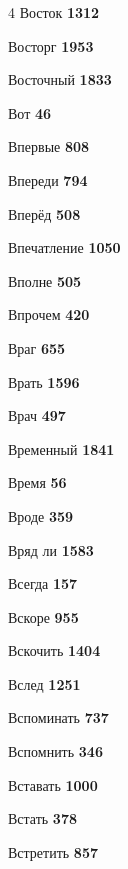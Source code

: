 \begin{multicols}{4}
\noindent Восток \dotfill \textbf{\color{secondary} 1312}\par
\noindent Восторг \dotfill \textbf{\color{secondary} 1953}\par
\noindent Восточный \dotfill \textbf{\color{secondary} 1833}\par
\noindent Вот \dotfill \textbf{\color{secondary} 46}\par
\noindent Впервые \dotfill \textbf{\color{secondary} 808}\par
\noindent Впереди \dotfill \textbf{\color{secondary} 794}\par
\noindent Вперёд \dotfill \textbf{\color{secondary} 508}\par
\noindent Впечатление \dotfill \textbf{\color{secondary} 1050}\par
\noindent Вполне \dotfill \textbf{\color{secondary} 505}\par
\noindent Впрочем \dotfill \textbf{\color{secondary} 420}\par
\noindent Враг \dotfill \textbf{\color{secondary} 655}\par
\noindent Врать \dotfill \textbf{\color{secondary} 1596}\par
\noindent Врач \dotfill \textbf{\color{secondary} 497}\par
\noindent Временный \dotfill \textbf{\color{secondary} 1841}\par
\noindent Время \dotfill \textbf{\color{secondary} 56}\par
\noindent Вроде \dotfill \textbf{\color{secondary} 359}\par
\noindent Вряд ли \dotfill \textbf{\color{secondary} 1583}\par
\noindent Всегда \dotfill \textbf{\color{secondary} 157}\par
\noindent Вскоре \dotfill \textbf{\color{secondary} 955}\par
\noindent Вскочить \dotfill \textbf{\color{secondary} 1404}\par
\noindent Вслед \dotfill \textbf{\color{secondary} 1251}\par
\noindent Вспоминать \dotfill \textbf{\color{secondary} 737}\par
\noindent Вспомнить \dotfill \textbf{\color{secondary} 346}\par
\noindent Вставать \dotfill \textbf{\color{secondary} 1000}\par
\noindent Встать \dotfill \textbf{\color{secondary} 378}\par
\noindent Встретить \dotfill \textbf{\color{secondary} 857}\par

\end{multicols}
